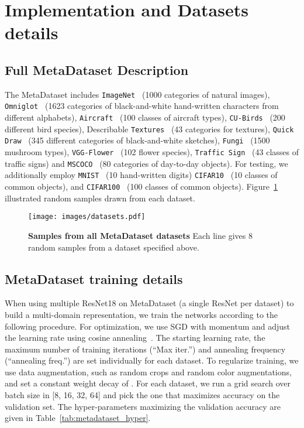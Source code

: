 \documentclass[runningheads]{llncs}
\begin{document}
\appendix
\section{Implementation and Datasets details}
\subsection{Full MetaDataset Description}
The MetaDataset includes
\texttt{ImageNet}~\cite{imagenet} (1000 categories of natural images),
\texttt{Omniglot}~\cite{lake2015human} (1623 categories of black-and-white
hand-written characters from different alphabets),
\texttt{Aircraft}~\cite{maji13fine-grained} (100 classes of aircraft types),
\texttt{CU-Birds}~\cite{wah2011caltech} (200 different bird species),
Describable \texttt{Textures}~\cite{cimpoi2014describing} (43 categories for
textures), \texttt{Quick Draw}~\cite{quickdraw} (345 different categories of
black-and-white sketches), \texttt{Fungi}~\cite{fungi} (1500 mushroom
types), \texttt{VGG-Flower}~\cite{nilsback2008automated} (102
flower species), \texttt{Traffic Sign}~\cite{houben2013detection} (43 classes of
traffic signs) and \texttt{MSCOCO}~\cite{coco} (80 categories of day-to-day
objects). For testing, we additionally employ \texttt{MNIST}~\cite{mnist} (10
hand-written digits)
\texttt{CIFAR10}~\cite{krizhevsky2009learning} (10 classes of common objects), and
\texttt{CIFAR100}~\cite{krizhevsky2009learning} (100 classes of common objects).
Figure~\ref{fig:datasets} illustrated random samples drawn from each dataset.

\begin{figure}[th!]
   \centering
  \texttt{[image: images/datasets.pdf]}
\caption{\textbf{Samples from all MetaDataset datasets} Each line gives 8 random
samples from a dataset specified above.}\label{fig:datasets}
\end{figure}


\subsection{MetaDataset training details}
When using multiple ResNet18 on MetaDataset (a single ResNet per dataset) to
build a multi-domain representation, we train the networks according to the
following procedure.
For optimization, we use SGD with momentum and adjust the learning rate using
cosine annealing~\cite{loshchilov2016sgdr}. The starting learning rate, the maximum number of
training iterations (``Max iter.'') and annealing frequency (``annealing
freq.'') are set individually for each dataset. To regularize training, we use
data augmentation, such as random crops and random color augmentations, and set
a constant weight decay of . For each dataset, we run a grid
search over batch size in [8, 16, 32, 64] and pick the one that maximizes
accuracy on the validation set. The hyper-parameters maximizing the validation
accuracy are given in Table~\ref{tab:metadataset_hyper}.
\end{document}
